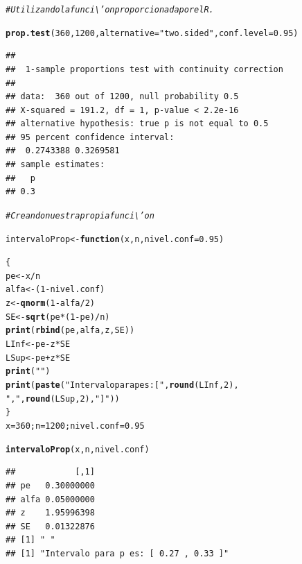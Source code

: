 \documentclass[12pt,letterpaper]{article}\usepackage[]{graphicx}\usepackage[]{color}
\makeatletter
\newcommand{\hlnum}[1]{\textcolor[rgb]{0.686,0.059,0.569}{#1}}%
\newcommand{\hlstr}[1]{\textcolor[rgb]{0.192,0.494,0.8}{#1}}%
\newcommand{\hlcom}[1]{\textcolor[rgb]{0.678,0.584,0.686}{\textit{#1}}}%
\newcommand{\hlopt}[1]{\textcolor[rgb]{0,0,0}{#1}}%
\newcommand{\hlstd}[1]{\textcolor[rgb]{0.345,0.345,0.345}{#1}}%
\newcommand{\hlkwa}[1]{\textcolor[rgb]{0.161,0.373,0.58}{\textbf{#1}}}%
\newcommand{\hlkwb}[1]{\textcolor[rgb]{0.69,0.353,0.396}{#1}}%
\newcommand{\hlkwc}[1]{\textcolor[rgb]{0.333,0.667,0.333}{#1}}%
\newcommand{\hlkwd}[1]{\textcolor[rgb]{0.737,0.353,0.396}{\textbf{#1}}}%
\newenvironment{kframe}{%
 \def\at@end@of@kframe{}%
 \ifinner\ifhmode%
  \def\at@end@of@kframe{\end{minipage}}%
  \begin{minipage}{\columnwidth}%
 \fi\fi%
 \def\FrameCommand##1{\hskip\@totalleftmargin \hskip-\fboxsep
 \colorbox{shadecolor}{##1}\hskip-\fboxsep
     \hskip-\linewidth \hskip-\@totalleftmargin \hskip\columnwidth}%
 \MakeFramed {\advance\hsize-\width
   \@totalleftmargin\z@ \linewidth\hsize
   \@setminipage}}%
 {\par\unskip\endMakeFramed%
 \at@end@of@kframe}
\newenvironment{knitrout}{}{} %
\makeatother
\begin{document}
\begin{knitrout}
\color{fgcolor}\begin{kframe}
\begin{alltt}
\hlcom{# Utilizando la funci\textbackslash{}'on proporcionada por el R.}

\hlkwd{prop.test}\hlstd{(}\hlnum{360}\hlstd{,} \hlnum{1200}\hlstd{,} \hlkwc{alternative} \hlstd{=} \hlstr{"two.sided"}\hlstd{,} \hlkwc{conf.level}\hlstd{=}\hlnum{0.95}\hlstd{)}
\end{alltt}
\begin{verbatim}
## 
## 	1-sample proportions test with continuity correction
## 
## data:  360 out of 1200, null probability 0.5
## X-squared = 191.2, df = 1, p-value < 2.2e-16
## alternative hypothesis: true p is not equal to 0.5
## 95 percent confidence interval:
##  0.2743388 0.3269581
## sample estimates:
##   p 
## 0.3
\end{verbatim}
\end{kframe}
\end{knitrout}

\begin{knitrout}
\color{fgcolor}\begin{kframe}
\begin{alltt}
\hlcom{# Creando nuestra propia funci\textbackslash{}'on}

\hlstd{intervaloProp} \hlkwb{<-} \hlkwa{function}\hlstd{(}\hlkwc{x}\hlstd{,} \hlkwc{n}\hlstd{,} \hlkwc{nivel.conf} \hlstd{=} \hlnum{0.95}\hlstd{)}

\hlstd{\{}
\hlstd{pe} \hlkwb{<-} \hlstd{x}\hlopt{/}\hlstd{n}
\hlstd{alfa} \hlkwb{<-} \hlstd{(}\hlnum{1} \hlopt{-} \hlstd{nivel.conf)}
\hlstd{z} \hlkwb{<-} \hlkwd{qnorm}\hlstd{(}\hlnum{1}\hlopt{-}\hlstd{alfa}\hlopt{/}\hlnum{2}\hlstd{)}
\hlstd{SE} \hlkwb{<-} \hlkwd{sqrt}\hlstd{(pe}\hlopt{*}\hlstd{(}\hlnum{1}\hlopt{-}\hlstd{pe)}\hlopt{/}\hlstd{n)}
  \hlkwd{print}\hlstd{(}\hlkwd{rbind}\hlstd{(pe, alfa, z, SE))}
\hlstd{LInf} \hlkwb{<-} \hlstd{pe}\hlopt{-}\hlstd{z}\hlopt{*}\hlstd{SE}
\hlstd{LSup} \hlkwb{<-} \hlstd{pe}\hlopt{+}\hlstd{z}\hlopt{*}\hlstd{SE}
\hlkwd{print}\hlstd{(}\hlstr{" "}\hlstd{)}
  \hlkwd{print}\hlstd{(}\hlkwd{paste}\hlstd{(}\hlstr{"Intervalo para p es: ["}\hlstd{,} \hlkwd{round}\hlstd{(LInf,} \hlnum{2}\hlstd{),}
              \hlstr{","}\hlstd{,} \hlkwd{round}\hlstd{(LSup,} \hlnum{2}\hlstd{),} \hlstr{"]"}\hlstd{))}
\hlstd{\}}
\hlstd{x}\hlkwb{=}\hlnum{360}\hlstd{; n}\hlkwb{=}\hlnum{1200}\hlstd{; nivel.conf}\hlkwb{=}\hlnum{0.95}

\hlkwd{intervaloProp}\hlstd{(x, n, nivel.conf)}
\end{alltt}
\begin{verbatim}
##            [,1]
## pe   0.30000000
## alfa 0.05000000
## z    1.95996398
## SE   0.01322876
## [1] " "
## [1] "Intervalo para p es: [ 0.27 , 0.33 ]"
\end{verbatim}
\end{kframe}
\end{knitrout}
\end{document}
